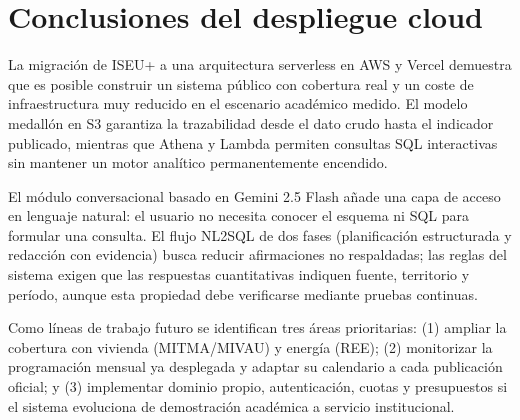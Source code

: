 \section{Conclusiones del despliegue cloud}

La migración de ISEU+ a una arquitectura serverless en AWS y Vercel demuestra que es posible construir un sistema público con cobertura real y un coste de infraestructura muy reducido en el escenario académico medido. El modelo medallón en S3 garantiza la trazabilidad desde el dato crudo hasta el indicador publicado, mientras que Athena y Lambda permiten consultas SQL interactivas sin mantener un motor analítico permanentemente encendido.

El módulo conversacional basado en Gemini 2.5 Flash añade una capa de acceso en lenguaje natural: el usuario no necesita conocer el esquema ni SQL para formular una consulta. El flujo NL2SQL de dos fases (planificación estructurada y redacción con evidencia) busca reducir afirmaciones no respaldadas; las reglas del sistema exigen que las respuestas cuantitativas indiquen fuente, territorio y período, aunque esta propiedad debe verificarse mediante pruebas continuas.

Como líneas de trabajo futuro se identifican tres áreas prioritarias: (1) ampliar la cobertura con vivienda (MITMA/MIVAU) y energía (REE); (2) monitorizar la programación mensual ya desplegada y adaptar su calendario a cada publicación oficial; y (3) implementar dominio propio, autenticación, cuotas y presupuestos si el sistema evoluciona de demostración académica a servicio institucional.
